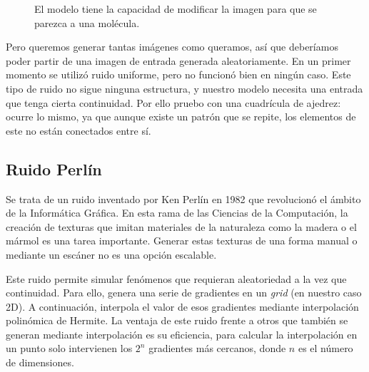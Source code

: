 \begin{figure}[H]
\centering
    \caption{El modelo tiene la capacidad de modificar la imagen para que se parezca a una molécula.}
\end{figure}

Pero queremos generar tantas imágenes como queramos, así que deberíamos poder partir de una imagen de entrada generada aleatoriamente. En un primer momento se utilizó ruido uniforme, pero no funcionó bien en ningún caso. Este tipo de ruido no sigue ninguna estructura, y nuestro modelo necesita una entrada que tenga cierta continuidad. Por ello pruebo con una cuadrícula de ajedrez: ocurre lo mismo, ya que aunque existe un patrón que se repite, los elementos de este no están conectados entre sí.

\subsection{Ruido Perlín}
Se trata de un ruido inventado por Ken Perlín en 1982 que revolucionó el ámbito de la Informática Gráfica. En esta rama de las Ciencias de la Computación, la creación de texturas que imitan materiales de la naturaleza como la madera o el mármol es una tarea importante. Generar estas texturas de una forma manual o mediante un escáner no es una opción escalable.

Este ruido permite simular fenómenos que requieran aleatoriedad a la vez que continuidad. Para ello, genera una serie de gradientes en un \textit{grid} (en nuestro caso 2D). A continuación, interpola el valor de esos gradientes mediante interpolación polinómica de Hermite. La ventaja de este ruido frente a otros que también se generan mediante interpolación es su eficiencia, para calcular la interpolación en un punto solo intervienen los $2^n$ gradientes más cercanos, donde $n$ es el número de dimensiones. \cite{computer-graphics-epfl}


